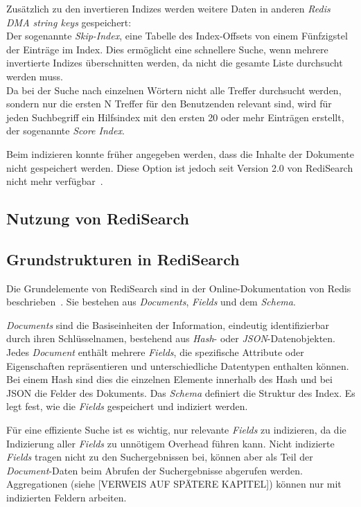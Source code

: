 Zusätzlich zu den invertieren Indizes werden weitere Daten in anderen \textit{Redis DMA string keys} gespeichert:\\
Der sogenannte \emph{Skip-Index}, eine Tabelle des Index-Offsets von einem Fünfzigstel der Einträge im Index. Dies ermöglicht eine schnellere Suche, wenn mehrere invertierte Indizes überschnitten werden, da nicht die gesamte Liste durchsucht werden muss.\\
Da bei der Suche nach einzelnen Wörtern nicht alle Treffer durchsucht werden, sondern nur die ersten N Treffer für den Benutzenden relevant sind, wird für jeden Suchbegriff ein Hilfsindex mit den ersten 20 oder mehr Einträgen erstellt, der sogenannte \emph{Score Index}.

Beim indizieren konnte früher angegeben werden, dass die Inhalte der Dokumente nicht gespeichert werden. Diese Option ist jedoch seit Version 2.0 von RediSearch nicht mehr verfügbar~\cite{redis_ltd_upgrade_nodate, korland_missing_nodate}.

\subsection{Nutzung von RediSearch} %

\subsection{Grundstrukturen in RediSearch}
Die Grundelemente von RediSearch sind in der Online-Dokumentation von Redis beschrieben~\cite{redis_ltd_basic_nodate}.
Sie bestehen aus \emph{Documents}, \emph{Fields} und dem \emph{Schema}.

\emph{Documents} sind die Basiseinheiten der Information, eindeutig identifizierbar durch ihren Schlüsselnamen, bestehend aus \emph{Hash}- oder \emph{JSON}-Datenobjekten. Jedes \emph{Document} enthält mehrere \emph{Fields}, die spezifische Attribute oder Eigenschaften repräsentieren und unterschiedliche Datentypen enthalten können. Bei einem Hash sind dies die einzelnen Elemente innerhalb des Hash und bei JSON die Felder des Dokuments.
Das \emph{Schema} definiert die Struktur des Index. Es legt fest, wie die \emph{Fields} gespeichert und indiziert werden.

Für eine effiziente Suche ist es wichtig, nur relevante \emph{Fields} zu indizieren, da die Indizierung aller \emph{Fields} zu unnötigem Overhead führen kann. Nicht indizierte \emph{Fields} tragen nicht zu den Suchergebnissen bei, können aber als Teil der \emph{Document}-Daten beim Abrufen der Suchergebnisse abgerufen werden. Aggregationen (siehe [VERWEIS AUF SPÄTERE KAPITEL]) können nur mit indizierten Feldern arbeiten. %

